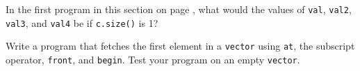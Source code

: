 %
%
\begin{question}
In the first program in this section on page \pageref{lst:visit first or last element of sequential container}, what would
the values of \verb|val|, \verb|val2|, \verb|val3|, and \verb|val4| be if \verb|c.size()| is 1?
\end{question}

\begin{question}
Write a program that fetches the first element in a \verb|vector|
using \verb|at|, the subscript operator, \verb|front|, and \verb|begin|. Test your program on
an empty \verb|vector|.
\end{question}
